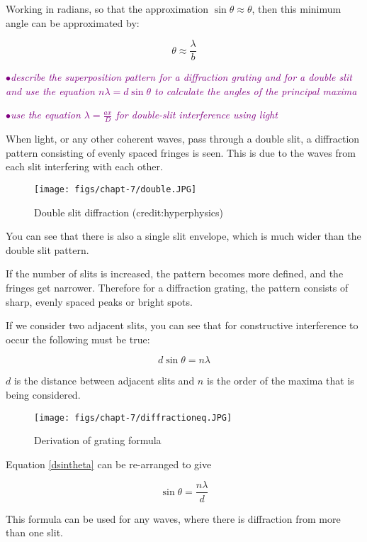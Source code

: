 \documentclass[a4paper,11pt,twoside]{memoir}
\newcounter{spec}[chapter]
\newcommand{\spec}[1]{\Needspace{5\baselineskip}\textcolor{purple}{$\bullet$\hspace{0.5cm}\textit{#1}}}
\begin{document}
Working in radians, so that the approximation $\sin{\theta} \approx \theta$, then this minimum angle can be approximated by:

$$\theta \approx \frac{\lambda}{b}$$

\spec{describe the superposition pattern for a diffraction grating and for a double slit and use the equation $n\lambda = d \sin\theta$ to calculate the angles of the principal maxima}

\spec{use the equation $\lambda = \frac{ax}{D}$ for double-slit interference using light}

When light, or any other coherent waves, pass through a double slit, a diffraction pattern consisting of evenly spaced fringes is seen. This is due to the waves from each slit interfering with each other.

\begin{figure}[h!]
\centering
\texttt{[image: figs/chapt-7/double.JPG]}
\caption{Double slit diffraction (credit:hyperphysics)}
\end{figure}

You can see that there is also a single slit envelope, which is much wider than the double slit pattern.

If the number of slits is increased, the pattern becomes more defined, and the fringes get narrower. Therefore for a diffraction grating, the pattern consists of sharp, evenly spaced peaks or bright spots.

If we consider two adjacent slits, you can see that for constructive interference to occur the following must be true:

\begin{equation}\label{dsintheta}
d \sin\theta = n\lambda
\end{equation}

$d$ is the distance between adjacent slits and $n$ is the order of the maxima that is being considered.

\begin{figure}[h!]
\centering
\texttt{[image: figs/chapt-7/diffractioneq.JPG]}
\caption{Derivation of grating formula}
\end{figure}

Equation \ref{dsintheta} can be re-arranged to give

\begin{equation}
\sin\theta = \frac{n\lambda}{d}
\end{equation}

This formula can be used for any waves, where there is diffraction from more than one slit.
\end{document}
